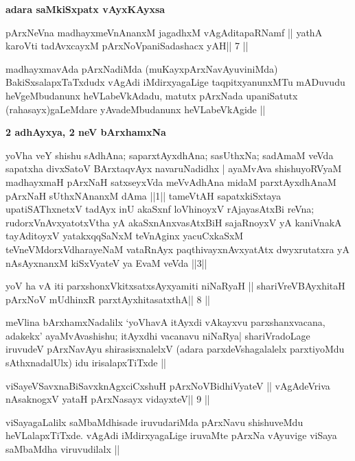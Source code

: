 \medskip
\centerline{\textbf{adara saMkiSxpatx vAyxKAyxsa}}

\begin{shl}
pArxNeVna madhayxmeVnAnanxM jagadhxM vAgAditapaRNamf ||
yathA karoVti tadAvxcayxM pArxNoVpaniSadashacx yAH\hfill || 7 ||
\end{shl}

\begin{artha}
madhayxmavAda pArxNadiMda (muKayxpArxNavAyuviniMda)
BakiSxsalapxTaTxdudx vAgAdi iMdirxyagaLige taqpitxyanunxMTu mADuvudu
heVgeMbudanunx heVLabeVkAdadu, matutx pArxNada upaniSatutx
(rahasayx)gaLeMdare yAvadeMbudanunx heVLabeVkAgide ||
\end{artha}

\medskip
\centerline{\textbf{2 adhAyxya, 2 neV bArxhamxNa}}

\begin{artha}
yoVha veY shishu sAdhAna; saparxtAyxdhAna; sasUthxNa; sadAmaM veVda
sapatxha divxSatoV BArxtaqvAyx navaruNadidhx | ayaMvAva shishuyoRVyaM
madhayxmaH pArxNaH satxseyxVda meVvAdhAna midaM parxtAyxdhAnaM pArxNaH
sUthxNAnanxM dAma ||1|| tameVtAH sapatxkiSxtaya upatiSAThxnetxV tadAyx
inU akaSxnf loVhinoyxV rAjayasAtxBi reVna; rudorxV\s nAvxyatotxV\s tha
yA akaSxnAnxvasAtxBiH sajaRnoyxV yA kaniVnakA tayAditoyxV
yatakxqqSaNxM teVnAginx yacuCxkaSxM teVneVMdorxV\s dharayeNaM
vataRnAyx paqthivayxnAvxyatAtx dwyxrutatxra yA nAsAyxnanxM kiSxVyateV
ya EvaM veVda ||3||
\end{artha}

\begin{shl}
yoV ha vA iti parxshonxVkitxsatxsAyxyamiti niNaRyaH ||
shariVreV\s BAyxhitaH pArxNoV mUdhinxR parxtAyxhitasatxthA\hfill || 8 ||
\end{shl}

\begin{center}
meVlina bArxhamxNadalilx `yoVhavA itAyxdi vAkayxvu parxshanxvacana,
adakekx' ayaMvAvashishu; itAyxdhi vacanavu niNaRya| shariVradoLage
iruvudeV pArxNavAyu shirasisxnalelxV (adara parxdeVshagalalelx
parxtiyoMdu sAthxnadalUlx) idu irisalapxTiTxde ||
\end{center}

\begin{shl}
viSayeVSavxnaBiSavxknAgxciCxshuH  pArxNoV\s BidhiVyateV ||
vAgAdeVriva nA\s\s saknogxV yataH pArxNasayx vidayxteV\hfill || 9 ||
\end{shl}

\begin{artha}
viSayagaLalilx saMbaMdhisade iruvudariMda pArxNavu shishuveMdu
heVLalapxTiTxde. vAgAdi iMdirxyagaLige iruvaMte pArxNa vAyuvige viSaya
saMbaMdha viruvudilalx ||
\end{artha}

